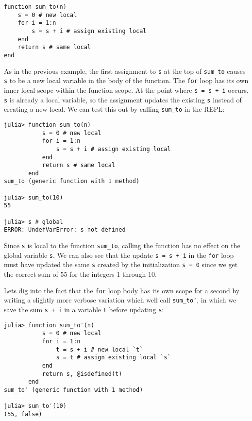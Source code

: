 \begin{verbatim}
function sum_to(n)
    s = 0 # new local
    for i = 1:n
        s = s + i # assign existing local
    end
    return s # same local
end
\end{verbatim}



As in the previous example, the first assignment to \texttt{s} at the top of \texttt{sum\_to} causes \texttt{s} to be a new local variable in the body of the function. The \texttt{for} loop has its own inner local scope within the function scope. At the point where \texttt{s = s + i} occurs, \texttt{s} is already a local variable, so the assignment updates the existing \texttt{s} instead of creating a new local. We can test this out by calling \texttt{sum\_to} in the REPL:




\begin{verbatim}
julia> function sum_to(n)
           s = 0 # new local
           for i = 1:n
               s = s + i # assign existing local
           end
           return s # same local
       end
sum_to (generic function with 1 method)

julia> sum_to(10)
55

julia> s # global
ERROR: UndefVarError: s not defined
\end{verbatim}



Since \texttt{s} is local to the function \texttt{sum\_to}, calling the function has no effect on the global variable \texttt{s}. We can also see that the update \texttt{s = s + i} in the \texttt{for} loop must have updated the same \texttt{s} created by the initialization \texttt{s = 0} since we get the correct sum of 55 for the integers 1 through 10.



Let{\textquotesingle}s dig into the fact that the \texttt{for} loop body has its own scope for a second by writing a slightly more verbose variation which we{\textquotesingle}ll call \texttt{sum\_to′}, in which we save the sum \texttt{s + i} in a variable \texttt{t} before updating \texttt{s}:




\begin{verbatim}
julia> function sum_to′(n)
           s = 0 # new local
           for i = 1:n
               t = s + i # new local `t`
               s = t # assign existing local `s`
           end
           return s, @isdefined(t)
       end
sum_to′ (generic function with 1 method)

julia> sum_to′(10)
(55, false)
\end{verbatim}



